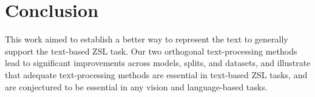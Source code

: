 \documentclass[11pt,a4paper]{article}
\newcommand\reut[1]{\textcolor{green}{\textbf{REUT:} #1 }}
\begin{document}


\par



\section{Conclusion}
\label{conclusion}

This work aimed to establish a better way to represent the text to generally support the text-based ZSL task. Our two orthogonal text-processing methods lead to significant improvements across models, splits, and datasets, and illustrate that adequate text-processing methods are essential in text-based ZSL tasks,  and are  conjectured to be essential in any vision and language-based tasks. 




\end{document}

